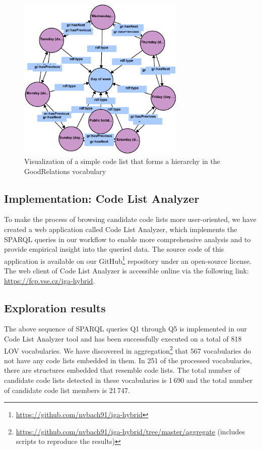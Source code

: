 \begin{figure}[h]
\centering
\includegraphics[width=8cm]{figures/code-list-days-of-week}
\caption{Visualization of a simple code list that forms a hierarchy in the GoodRelations vocabulary}
\label{fig:code-list-with-hierarchy}
\end{figure}

\subsection{Implementation: Code List Analyzer}

To make the process of browsing candidate code lists more user-oriented, we have created a web application called Code List Analyzer, which implements the SPARQL queries in our workflow to enable more comprehensive analysis and to provide empirical insight into the queried data. The source code of this application is available on our GitHub\footnote{\label{github-repo}\url{https://github.com/nvbach91/iga-hybrid}} repository under an open-source license. The web client of Code List Analyzer is accessible online via the following link: \url{https://fcp.vse.cz/iga-hybrid}.

\subsection{Exploration results}

The above sequence of SPARQL queries Q1 through Q5 is implemented in our Code List Analyzer tool and has been successfully executed on a total of 818 LOV vocabularies. %
We have discovered in aggregation\footnote{\url{https://github.com/nvbach91/iga-hybrid/tree/master/aggregate} (includes scripts to reproduce the results)} that 567 vocabularies do not have any code lists embedded in them. %
In 251 of the processed vocabularies, there are structures embedded that resemble code lists. The total number of candidate code lists detected in these vocabularies is 1\,690 and the total number of candidate code list members is 21\,747.

